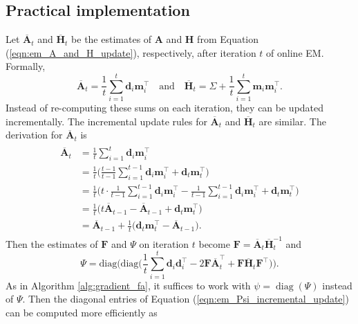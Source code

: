 \documentclass[msc,deptreport.inf]{infthesis} %
\newcommand{\matr}[1]{\mathbf{#1}}
\newcommand{\diag}{\mathop{\mathrm{diag}}}
\begin{document}
\subsection{Practical implementation}\label{sec:online_em_practical}

Let $\overline{\matr{A}}_t$ and $\overline{\matr{H}}_t$ be the estimates of $\matr{A}$ and $\matr{H}$ from Equation (\ref{eqn:em_A_and_H_update}), respectively, after iteration $t$ of online EM. Formally,
\begin{equation}\label{eqn:em_A_and_H_incremental_update}
	\overline{\matr{A}}_t = \frac{1}{t} \sum_{i=1}^t \matr{d}_i \matr{m}_i^\intercal \quad \text{and} \quad 
	\overline{\matr{H}}_t = \Sigma + \frac{1}{t} \sum_{i=1}^t \matr{m}_i \matr{m}_i^\intercal.
\end{equation}
Instead of re-computing these sums on each iteration, they can be updated incrementally. The incremental update rules for $\overline{\matr{A}}_t$ and  $\overline{\matr{H}}_t$ are similar. The derivation for $\overline{\matr{A}}_t$ is
\begin{align}
\begin{split}
	\overline{\matr{A}}_t 
	& = \frac{1}{t} \sum_{i=1}^t \matr{d}_i \matr{m}_i^\intercal \\
	& = \frac{1}{t}\Bigg(\frac{t-1}{t-1} \sum_{i=1}^{t-1} \matr{d}_i \matr{m}_i^\intercal + \matr{d}_t \matr{m}_t^\intercal \Bigg) \\
	& = \frac{1}{t}\Bigg(t \cdot \frac{1}{t-1} \sum_{i=1}^{t-1} \matr{d}_i \matr{m}_i^\intercal - \frac{1}{t-1} \sum_{i=1}^{t-1} \matr{d}_i \matr{m}_i^\intercal + \matr{d}_t \matr{m}_t^\intercal \Bigg) \\
	& = \frac{1}{t}\Big(t \overline{\matr{A}}_{t-1} - \overline{\matr{A}}_{t-1} + \matr{d}_t \matr{m}_t^\intercal \Big) \\
	& = \overline{\matr{A}}_{t-1} + \frac{1}{t} \big(\matr{d}_t \matr{m}_t^\intercal - \overline{\matr{A}}_{t-1} \big).
\end{split}
\end{align}
Then the estimates of $\matr{F}$ and $\Psi$ on iteration $t$ become $\matr{F} = \overline{\matr{A}}_t \overline{\matr{H}}_t^{-1}$ and
\begin{equation}\label{eqn:em_Psi_incremental_update}
	\Psi = \text{diag}\Bigg(\text{diag}\Bigg( \frac{1}{t} \sum_{i=1}^t \matr{d}_i \matr{d}_i^\intercal - 2 \matr{F}\overline{\matr{A}}_t^\intercal + \matr{F}\overline{\matr{H}}_t \matr{F}^\intercal \Bigg)\Bigg).
\end{equation}
As in Algorithm \ref{alg:gradient_fa}, it suffices to work with $\psi = \diag(\Psi)$ instead of $\Psi$. Then the diagonal entries of Equation (\ref{eqn:em_Psi_incremental_update}) can be computed more efficiently as 
\end{document}

